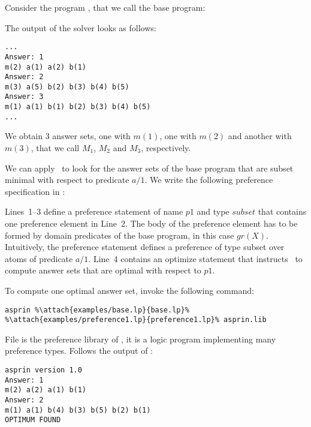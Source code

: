 \begin{example}
Consider the program
, 
that we call the base program:

The output of the solver looks as follows:
\begin{lstlisting}[numbers=none]
...
Answer: 1
m(2) a(1) a(2) b(1) 
Answer: 2
m(3) a(5) b(2) b(3) b(4) b(5) 
Answer: 3
m(1) a(1) b(1) b(2) b(3) b(4) b(5)
...
\end{lstlisting}
We obtain $3$ answer sets, one with $m(1)$, one with $m(2)$ and another with $m(3)$, 
that we call $M_1$, $M_2$ and $M_3$, respectively.

We can apply \asprin\ to look for the answer sets of the base program that are subset minimal with respect to predicate $a/1$. 
We write the following preference specification in  
: 

Lines~1--3 define a preference statement of name $p1$ and type $subset$ that contains one preference element in Line~2.
The body of the preference element has to be formed by domain predicates of the base program, in this case $gr(X)$.
Intuitively, the preference statement defines a preference of type subset over atoms of predicate $a/1$. 
Line~4 contains an optimize statement that instructs \asprin\ to compute answer sets that are optimal with respect to $p1$. 

To compute one optimal answer set, invoke the following command: 
%
\begin{lstlisting}[numbers=none,escapechar=\%]
asprin %\attach{examples/base.lp}{base.lp}% %\attach{examples/preference1.lp}{preference1.lp}% asprin.lib
\end{lstlisting}
File  is the preference library of \asprin, 
it is a logic program implementing many preference types.
Follows the output of \asprin:
\begin{lstlisting}[numbers=none]
asprin version 1.0
Answer: 1
m(2) a(2) a(1) b(1)
Answer: 2
m(1) a(1) b(4) b(3) b(5) b(2) b(1)
OPTIMUM FOUND


\end{lstlisting}
\end{example}
